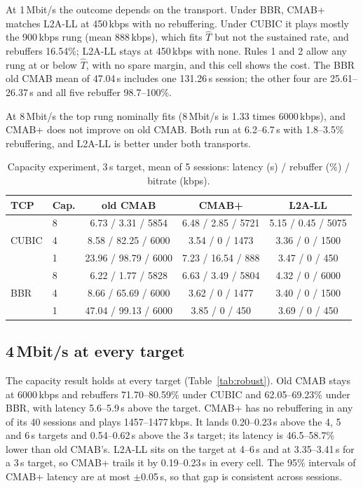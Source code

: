 \documentclass[sigconf]{acmart}
\newcommand{\cmabp}{CMAB+\xspace}
\newcommand{\oldcmab}{old CMAB\xspace}
\newcommand{\That}{\hat{T}}
\newcommand{\kbps}{\,kbps\xspace}
\begin{document}
At 1\,Mbit/s the outcome depends on the transport. Under BBR, \cmabp matches L2A-LL at 450\kbps with no rebuffering. Under CUBIC it plays mostly the 900\kbps rung (mean 888\kbps), which fits $\That$ but not the sustained rate, and rebuffers 16.54\%; L2A-LL stays at 450\kbps with none. Rules 1 and 2 allow any rung at or below $\That$, with no spare margin, and this cell shows the cost. The BBR \oldcmab mean of 47.04\,s includes one 131.26\,s session; the other four are 25.61--26.37\,s and all five rebuffer 98.7--100\%.

At 8\,Mbit/s the top rung nominally fits (8\,Mbit/s is 1.33 times 6000\kbps), and \cmabp does not improve on \oldcmab. Both run at 6.2--6.7\,s with 1.8--3.5\% rebuffering, and L2A-LL is better under both transports.



\begin{table}[t]
\caption{Capacity experiment, 3\,s target, mean of 5 sessions: latency (s) / rebuffer (\%) / bitrate (kbps).}
\label{tab:capacity}
\footnotesize
\setlength{\tabcolsep}{3pt}
\begin{tabular}{@{}llccc@{}}
\toprule
TCP & Cap. & old CMAB & CMAB+ & L2A-LL \\
\midrule
\multirow{3}{*}{CUBIC} & 8 & 6.73 / 3.31 / 5854 & 6.48 / 2.85 / 5721 & 5.15 / 0.45 / 5075 \\
 & 4 & 8.58 / 82.25 / 6000 & 3.54 / 0 / 1473 & 3.36 / 0 / 1500 \\
 & 1 & 23.96 / 98.79 / 6000 & 7.23 / 16.54 / 888 & 3.47 / 0 / 450 \\
\midrule
\multirow{3}{*}{BBR} & 8 & 6.22 / 1.77 / 5828 & 6.63 / 3.49 / 5804 & 4.32 / 0 / 6000 \\
 & 4 & 8.66 / 65.69 / 6000 & 3.62 / 0 / 1477 & 3.40 / 0 / 1500 \\
 & 1 & 47.04 / 99.13 / 6000 & 3.85 / 0 / 450 & 3.69 / 0 / 450 \\
\bottomrule
\end{tabular}
\end{table}

\subsection{\texorpdfstring{4\,Mbit/s}{4 Mbit/s} at every target}
\label{sec:robust}

The capacity result holds at every target (Table~\ref{tab:robust}). Old CMAB stays at 6000\kbps and rebuffers 71.70--80.59\% under CUBIC and 62.05--69.23\% under BBR, with latency 5.6--5.9\,s above the target. \cmabp has no rebuffering in any of its 40 sessions and plays 1457--1477\kbps. It lands 0.20--0.23\,s above the 4, 5 and 6\,s targets and 0.54--0.62\,s above the 3\,s target; its latency is 46.5--58.7\% lower than \oldcmab's. L2A-LL sits on the target at 4--6\,s and at 3.35--3.41\,s for a 3\,s target, so \cmabp trails it by 0.19--0.23\,s in every cell. The 95\% intervals of \cmabp latency are at most $\pm$0.05\,s, so that gap is consistent across sessions.
\end{document}
